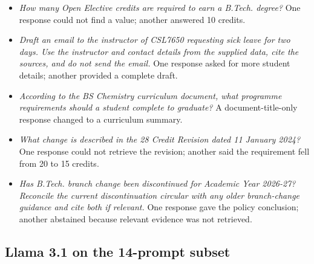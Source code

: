 \documentclass[11pt,a4paper]{article}
\begin{document}
\begin{itemize}
  \item \textit{How many Open Elective credits are required to earn a B.Tech. degree?} One response could not find a value; another answered 10 credits.
  \item \textit{Draft an email to the instructor of CSL7650 requesting sick leave for two days. Use the instructor and contact details from the supplied data, cite the sources, and do not send the email.} One response asked for more student details; another provided a complete draft.
  \item \textit{According to the BS Chemistry curriculum document, what programme requirements should a student complete to graduate?} A document-title-only response changed to a curriculum summary.
  \item \textit{What change is described in the 28 Credit Revision dated 11 January 2024?} One response could not retrieve the revision; another said the requirement fell from 20 to 15 credits.
  \item \textit{Has B.Tech. branch change been discontinued for Academic Year 2026-27? Reconcile the current discontinuation circular with any older branch-change guidance and cite both if relevant.} One response gave the policy conclusion; another abstained because relevant evidence was not retrieved.
\end{itemize}

\subsection{Llama 3.1 on the 14-prompt subset}
\end{document}
